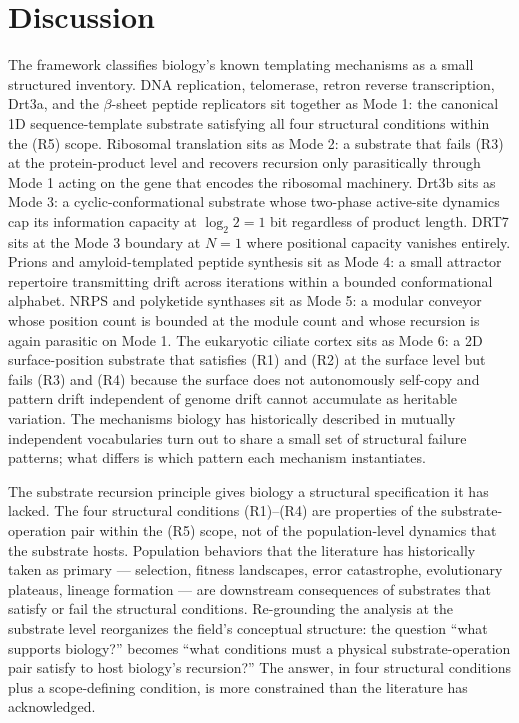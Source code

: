 \documentclass[aps,prx,reprint,amsmath,amssymb,floatfix,superscriptaddress,nofootinbib]{revtex4-2}
\theoremstyle{plain-thm}
\theoremstyle{definition-thm}
\begin{document}
\section{Discussion}

The framework classifies biology's known templating mechanisms as a small structured inventory. DNA replication, telomerase, retron reverse transcription, Drt3a, and the $\beta$-sheet peptide replicators \citep{Greenwald2016} sit together as Mode 1: the canonical 1D sequence-template substrate satisfying all four structural conditions within the (R5) scope. Ribosomal translation sits as Mode 2: a substrate that fails (R3) at the protein-product level and recovers recursion only parasitically through Mode 1 acting on the gene that encodes the ribosomal machinery. Drt3b sits as Mode 3: a cyclic-conformational substrate whose two-phase active-site dynamics cap its information capacity at $\log_2 2 = 1$ bit regardless of product length. DRT7 sits at the Mode 3 boundary at $N = 1$ where positional capacity vanishes entirely. Prions and amyloid-templated peptide synthesis sit as Mode 4: a small attractor repertoire transmitting drift across iterations within a bounded conformational alphabet. NRPS and polyketide synthases sit as Mode 5: a modular conveyor whose position count is bounded at the module count and whose recursion is again parasitic on Mode 1. The eukaryotic ciliate cortex sits as Mode 6: a 2D surface-position substrate that satisfies (R1) and (R2) at the surface level but fails (R3) and (R4) because the surface does not autonomously self-copy and pattern drift independent of genome drift cannot accumulate as heritable variation. The mechanisms biology has historically described in mutually independent vocabularies turn out to share a small set of structural failure patterns; what differs is which pattern each mechanism instantiates.

The substrate recursion principle gives biology a structural specification it has lacked. The four structural conditions (R1)--(R4) are properties of the substrate-operation pair within the (R5) scope, not of the population-level dynamics that the substrate hosts. Population behaviors that the literature has historically taken as primary --- selection, fitness landscapes, error catastrophe, evolutionary plateaus, lineage formation --- are downstream consequences of substrates that satisfy or fail the structural conditions. Re-grounding the analysis at the substrate level reorganizes the field's conceptual structure: the question ``what supports biology?'' becomes ``what conditions must a physical substrate-operation pair satisfy to host biology's recursion?'' The answer, in four structural conditions plus a scope-defining condition, is more constrained than the literature has acknowledged.
\end{document}
